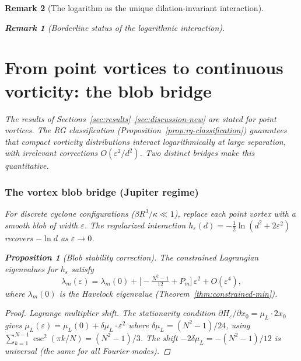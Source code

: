 \documentclass[12pt, a4paper]{article}
\newtheorem{proposition}[theorem]{Proposition}
\newtheorem{remark}{Remark}[section]
\numberwithin{equation}{section}
\begin{document}
\begin{remark}[The logarithm as the unique dilation-invariant interaction]
\begin{remark}[Borderline status of the logarithmic interaction]
\section{From point vortices to continuous vorticity: the blob bridge}
\label{sec:blob-bridge}
\label{sec:blob}

The results of Sections~\ref{sec:results}--\ref{sec:discussion-new} are
stated for point vortices.  The RG classification
(Proposition~\ref{prop:rg-classification}) guarantees that
compact vorticity distributions interact logarithmically at large
separation, with irrelevant corrections $O(\varepsilon^2/d^2)$.
Two distinct bridges make this quantitative.

\subsubsection{The vortex blob bridge (Jupiter regime)}

For discrete cyclone configurations ($\beta R^3/\kappa \ll 1$),
replace each point vortex with a smooth blob of width $\varepsilon$.
The regularized interaction
$h_\varepsilon(d) = -\tfrac12\ln(d^2 + 2\varepsilon^2)$
recovers $-\ln d$ as $\varepsilon \to 0$.

\begin{proposition}[Blob stability correction]
\label{prop:blob}
The constrained Lagrangian eigenvalues for $h_\varepsilon$ satisfy
\begin{equation}\label{eq:blob-correction}
  \lambda_m(\varepsilon) = \lambda_m(0)
  + \bigl[-\tfrac{N^2-1}{12} + P_m\bigr]\,\varepsilon^2
  + O(\varepsilon^4),
\end{equation}
where $\lambda_m(0)$ is the Havelock eigenvalue
(Theorem~\ref{thm:constrained-min}).
\end{proposition}

\begin{proof}
\emph{Lagrange multiplier shift.}  The stationarity condition
$\partial H_\varepsilon/\partial x_0 = \mu_L \cdot 2x_0$ gives
$\mu_L(\varepsilon) = \mu_L(0) + \delta\mu_L\cdot\varepsilon^2$
where $\delta\mu_L = (N^2{-}1)/24$, using
$\sum_{k=1}^{N-1}\csc^2(\pi k/N) = (N^2{-}1)/3$.  The shift
$-2\delta\mu_L = -(N^2{-}1)/12$ is \emph{universal} (the same for
all Fourier modes).


\end{proof}
\end{remark}
\end{remark}
\end{document}
